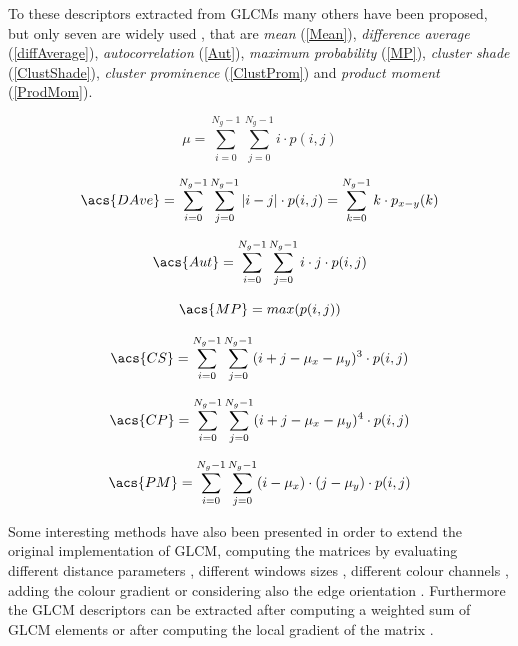 \documentclass[final,a4paper,12pt,english]{UnicaPhdThesis3}
\begin{document}
To these descriptors extracted from GLCMs many others have been proposed, but only seven are widely used \cite{Soh, Clausi}, that are \textit{mean} (\ref {Mean}), \textit{difference average} (\ref{diffAverage}), \textit{autocorrelation} (\ref{Aut}), \textit{maximum probability} (\ref{MP}), \textit{cluster shade} (\ref{ClustShade}),  \textit{cluster prominence} (\ref {ClustProm}) and \textit{product moment} (\ref {ProdMom}). 

\begin{equation}\label{Mean}
{\mu}=\sum_{i=0}^{N_{g}-1}\sum_{j=0}^{N_{g}-1} i \cdot p(i,j)
\end{equation}

\begin{equation}\label{diffAverage}
\acs{DAve}= \sum_{i=0}^{N_{g}-1}\sum_{j=0}^{N_{g}-1}  |i-j| \cdot p(i,j) = \sum_{k=0}^{N_{g}-1} k \cdot p_{x-y}(k)
\end{equation}

\begin{equation}\label{Aut}
\acs{Aut}=\sum_{i=0}^{N_{g}-1}\sum_{j=0}^{N_{g}-1} i \cdot j \cdot p(i,j)
\end{equation}

\begin{equation}\label{MP}
\acs{MP}=max(p(i,j))
\end{equation}

\begin{equation}\label{ClustShade}
\acs{CS}=\sum_{i=0}^{N_{g}-1}\sum_{j=0}^{N_{g}-1}  (i + j - \mu_x - \mu_y)^3 \cdot p(i,j)
\end{equation}

\begin{equation}\label{ClustProm}
\acs{CP}=\sum_{i=0}^{N_{g}-1}\sum_{j=0}^{N_{g}-1}  (i + j - \mu_x - \mu_y)^4 \cdot p(i,j)
\end{equation}

\begin{equation}\label{ProdMom}
\acs{PM}=\sum_{i=0}^{N_{g}-1}\sum_{j=0}^{N_{g}-1}  (i - \mu_x) \cdot (j - \mu_y) \cdot p(i,j)
\end{equation}

Some interesting methods have also been presented in order to extend the original implementation of GLCM, computing the matrices by evaluating different distance parameters \cite{Gelz}, different windows sizes \cite{HuY}, different colour channels \cite{Benco}, adding the colour gradient \cite{Gong} or considering also the edge orientation \cite{Mitrea}. Furthermore the GLCM descriptors can be extracted after computing a weighted sum of GLCM elements \cite{Walker} or after computing the local gradient of the matrix \cite{Chen}. 
\end{document}
